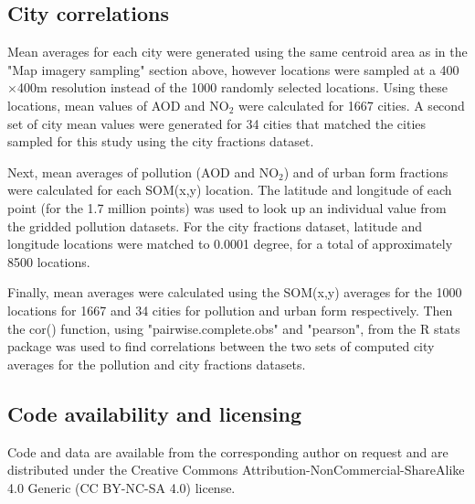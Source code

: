 \documentclass[9pt,twocolumn,twoside,lineno]{pnas-new}
\begin{document}
{\subsection*{City correlations}\label{correlations}
Mean averages for each city were generated using the same centroid area as in the "Map imagery sampling" section above, however locations were sampled at a 400$\times$400m resolution instead of the 1000 randomly selected locations. Using these locations, mean values of AOD and NO$_{2}$ were calculated for 1667 cities. A second set of city mean values were generated for 34 cities that matched the cities sampled for this study using the city fractions dataset.

Next, mean averages of pollution (AOD and NO$_{2}$) and of urban form fractions were calculated for each SOM(x,y) location. The latitude and longitude of each point (for the 1.7 million points) was used to look up an individual value from the gridded pollution datasets. For the city fractions dataset, latitude and longitude locations were matched to 0.0001 degree, for a total of approximately 8500 locations.

Finally, mean averages were calculated using the SOM(x,y) averages for the 1000 locations for 1667 and 34 cities for pollution and urban form respectively. Then the cor() function, using "pairwise.complete.obs" and "pearson", from the R stats package\cite{RCoreTeam2015} was used to find correlations between the two sets of computed city averages for the pollution and city fractions datasets.

\subsection*{Code availability and licensing}\label{sec:available}
Code and data are available from the corresponding author on request and are distributed under the Creative Commons Attribution-NonCommercial-ShareAlike 4.0 Generic (CC BY-NC-SA 4.0) license.







} %







\showmatmethods{} %




\end{document}
